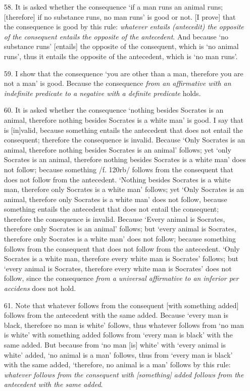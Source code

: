 \documentclass[]{article}
\begin{document}
\begin{enumerate}
\item[58.] It is asked whether the consequence `if a man runs an animal runs; [therefore] if no substance runs, no man runs' is good or not. [I prove] that the consequence is good by this rule: \textit{whatever entails (antecedit) the opposite of the consequent entails the opposite of the antecedent}. And because `no substance runs' [entails] the opposite of the consequent, which is `no animal runs', thus it entails the opposite of the antecedent, which is `no man runs'. 
\item[59.] I show that the consequence `you are other than a man, therefore you are not a man' is good. Because the consequence \textit{from an affirmative with an indefinite predicate to a negative with a definite predicate} holds. 
\item[60.] It is asked whether the consequence `nothing besides Socrates is an animal, therefore nothing besides Socrates is a white man' is good. I say that is [in]valid, because something entails the antecedent that does not entail the consequent; therefore the consequence is invalid. Because `Only Socrates is an animal, therefore nothing besides Socrates is an animal' follows; yet `only Socrates is an animal, therefore nothing besides Socrates is a white man' does not follow; because something /f. 120rb/ follows from the consequent that does not follow from the antecedent. `Nothing besides Socrates is a white man, therefore only Socrates is a white man' follows; yet `Only Socrates is an animal, therefore only Socrates is a white man' does not follow, because something entails the antecedent that does not entail the consequent; therefore the consequence is invalid. Because `Every animal is Socrates, therefore only Socrates is an animal' follows; but `every animal is Socrates, therefore only Socrates is a white man' does not follow; because something follows from the consequent that does not follow from the antecedent. `Only Socrates is a white man, therefore every white man is Socrates' follows; but `every animal is Socrates, therefore every white man is Socrates' does not follow, since the consequence \textit{from a universal affirmative to an inferior per accidens} does not hold.
\item[61.] Note that whatever follows from the consequent [with something added] follows from the antecedent with the same added. Because `every man is black, therefore no man is white' follows, thus whatever follows from `no man is white' with something added follows from `every man is black' with the same added. But because from `no man [is] white' with `every animal is white' added, `no animal is a man' follows, thus from `every man is black' with the same added, `therefore, no animal is a man' follows by this rule: \textit{whatever follows from the consequent with [something] added follows from the antecedent with the same added}.

\end{enumerate}
\end{document}
